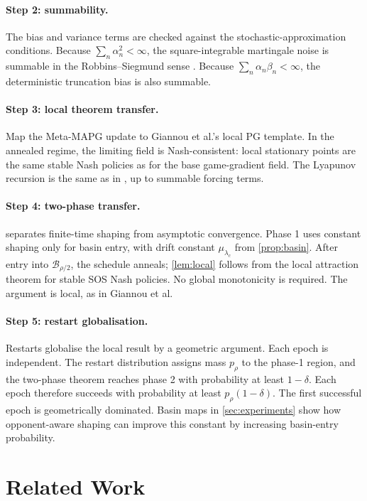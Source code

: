 \documentclass{article}
\theoremstyle{plain}
\theoremstyle{definition}
\theoremstyle{remark}
\newcommand{\B}{\mathcal{B}}
\begin{document}
\paragraph{Step 2: summability.}
The bias and variance terms are checked against the stochastic-approximation conditions. Because $\sum_n\alpha_n^2<\infty$, the square-integrable martingale noise is summable in the Robbins--Siegmund sense \citep{robbins1951stochastic,robbins1971convergence,hall1980martingale}. Because $\sum_n\alpha_n\beta_n<\infty$, the deterministic truncation bias is also summable.

\paragraph{Step 3: local theorem transfer.}
Map the Meta-MAPG update to Giannou et al.'s local PG template. In the annealed regime, the limiting field is Nash-consistent: local stationary points are the same stable Nash policies as for the base game-gradient field. The Lyapunov recursion is the same as in \citet{giannou2022convergence}, up to summable forcing terms.

\paragraph{Step 4: two-phase transfer.}
 separates finite-time shaping from asymptotic convergence. Phase 1 uses constant shaping only for basin entry, with drift constant $\mu_{\lambda_c}$ from \cref{prop:basin}. After entry into $\B_{\rho/2}$, the schedule anneals; \cref{lem:local} follows from the local attraction theorem for stable SOS Nash policies. No global monotonicity is required. The argument is local, as in Giannou et al.

\paragraph{Step 5: restart globalisation.}
Restarts globalise the local result by a geometric argument. Each epoch is independent. The restart distribution assigns mass $p_\rho$ to the phase-1 region, and the two-phase theorem reaches phase 2 with probability at least $1-\delta$. Each epoch therefore succeeds with probability at least $p_\rho(1-\delta)$. The first successful epoch is geometrically dominated. Basin maps in \cref{sec:experiments} show how opponent-aware shaping can improve this constant by increasing basin-entry probability.

\section{Related Work}\label{sec:related}
\end{document}
